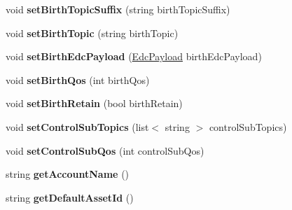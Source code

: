 \begin{DoxyCompactItemize}
\item 
\hypertarget{class_edc_configuration_a8c477a45fbe20ecdf5172409d98bd471}{void {\bfseries set\-Birth\-Topic\-Suffix} (string birth\-Topic\-Suffix)}\label{class_edc_configuration_a8c477a45fbe20ecdf5172409d98bd471}

\item 
\hypertarget{class_edc_configuration_aa0e12898161feac899dfbb84a8ae8233}{void {\bfseries set\-Birth\-Topic} (string birth\-Topic)}\label{class_edc_configuration_aa0e12898161feac899dfbb84a8ae8233}

\item 
\hypertarget{class_edc_configuration_aa59a2958f45d4126934c9b6f5f94bb73}{void {\bfseries set\-Birth\-Edc\-Payload} (\hyperlink{classedcdatatypes_1_1_edc_payload}{Edc\-Payload} birth\-Edc\-Payload)}\label{class_edc_configuration_aa59a2958f45d4126934c9b6f5f94bb73}

\item 
\hypertarget{class_edc_configuration_a9a59d1664a39c0d097085e66f4b4c8f5}{void {\bfseries set\-Birth\-Qos} (int birth\-Qos)}\label{class_edc_configuration_a9a59d1664a39c0d097085e66f4b4c8f5}

\item 
\hypertarget{class_edc_configuration_a25c10abee71b7577b2f62104eaecf602}{void {\bfseries set\-Birth\-Retain} (bool birth\-Retain)}\label{class_edc_configuration_a25c10abee71b7577b2f62104eaecf602}

\item 
\hypertarget{class_edc_configuration_ab8442ad9c26cfffa69ba2f12b3040da9}{void {\bfseries set\-Control\-Sub\-Topics} (list$<$ string $>$ control\-Sub\-Topics)}\label{class_edc_configuration_ab8442ad9c26cfffa69ba2f12b3040da9}

\item 
\hypertarget{class_edc_configuration_ad32a0f9b19415492293ee7d8c0ae0437}{void {\bfseries set\-Control\-Sub\-Qos} (int control\-Sub\-Qos)}\label{class_edc_configuration_ad32a0f9b19415492293ee7d8c0ae0437}

\item 
\hypertarget{class_edc_configuration_acd2666ad3a25a5dd03cf772eda44345a}{string {\bfseries get\-Account\-Name} ()}\label{class_edc_configuration_acd2666ad3a25a5dd03cf772eda44345a}

\item 
\hypertarget{class_edc_configuration_a4082b819c2c3ba693d83eaa25a3ed121}{string {\bfseries get\-Default\-Asset\-Id} ()}\label{class_edc_configuration_a4082b819c2c3ba693d83eaa25a3ed121}


\end{DoxyCompactItemize}
